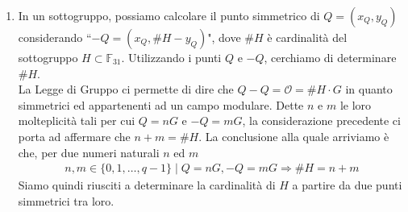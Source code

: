 \documentclass[a4paper,12pt]{tesiinfo}
\begin{document}
\begin{enumerate}
\begin{equation}
 \label{CPcard_pari}
\end{equation}
in questo caso abbiamo sempre cardinalit\`a \textbf{pari}. Anche in questo caso evidenziamo una generalizzazione: la (\ref{CPcard_pari}) vale per ogni coppia di punti $(n-k)G$ e $(n+k)G$ di medesima coordinata $x_{n-k} = x_{n+k}$. La distanza tra i due punti corrisponde a calcolare $2k$ Point Addition".
 \\
 \\
 Possiamo verificare che quanto espresso valga solo all'interno di sottogruppi del campo $K_p$ servendoci di un esempio: data la curva $E : y^2 = x^3 + 4x+5$ nel campo $\mathbb{Z}/31\mathbb{Z}$ e punto generatore $P = (18,9)$. Dal teorema di Hasse la curva ha cardinalit\`a compresa nell'intervallo $[27, 37]$ ed il conto esatto mostra che $\#E_K= 28$. Il punto $P$ considerato genera un sottogruppo $H$ i cui punti sono $P=(18,9), 2P=(0,6)$, $3P=(7,29)$, $4P=(7,2)$, $5P=(0,25)$, $6P=(18,22)$, $7P= \mathcal{O}$. La ricorsivit\`a delle ascisse vista precedentemente si mantiene valida in $H$, deduciamo che la cardinalit\`a di questo sottogruppo \`e 7 e resta valida la relazione 
 \begin{center}
  $P+6P=2P+5P = 3P+4P = \mathcal{O} \Rightarrow \#H = 7$
 \end{center} in quanto $3P$ e $4P$ sono punti successivi tra loro ed ascissa $x_{3P} = x_{4P} = 7$. Infine considerando che $\#H \ne \#E_K$ si dimostra che l'affermazione precedente resta valida all'interno di sottogruppi $H \subset K_p$. 
 \item In un sottogruppo, possiamo calcolare il punto simmetrico di $Q = (x_Q, y_Q)$ considerando ``$-Q = (x_Q, \#H-y_Q)$", dove $\#H$ \`e cardinalit\`a del sottogruppo $H \subset \mathbb{F}_{31}$. Utilizzando i punti $Q$ e $-Q$, cerchiamo di determinare $\#H$.
 \\
 La Legge di Gruppo ci permette di dire che $Q-Q = \mathcal{O} = \#H \cdot G$ in quanto simmetrici ed appartenenti ad un campo modulare. Dette $n$ e $m$ le loro molteplicit\`a tali per cui $Q = nG$ e $-Q = mG$, la considerazione precedente ci porta ad affermare che $n+m = \#H$. La conclusione alla quale arriviamo \`e che, per due numeri naturali $n$ ed $m$
 \begin{gather}
  n, m \in \{0, 1, \ldots, q-1\} \mid Q = nG, -Q = mG \Rightarrow \#H = n+m
  \label{Cons Pers 2}
 \end{gather}
 Siamo quindi riusciti a determinare la cardinalit\`a di $H$ a partire da due punti simmetrici tra loro.
\end{enumerate}
%
%
%
%
%
%
%
%
%
%
%
\end{document}
